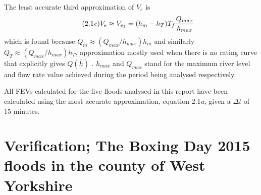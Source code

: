 \documentclass[11pt,a4paper]{article}
\begin{document}
The least accurate third approximation of $V_e$ is
\begin{equation}\tag{2.1\textit{e}}
V_e\approx V_{e_3}=(h_m-h_T)T_f\frac{Q_{max}}{h_{max}}
\end{equation}
which is found because $Q_m\approx (Q_{max}/h_{max})h_m$ and similarly $Q_T\approx (Q_{max}/h_{max})h_T$, approximation mostly used when there is no rating curve that explicitly gives $Q(\overline{h})$ \cite{Calder-Don}. $h_{max}$ and $Q_{max}$ stand for the maximum river level and flow rate value achieved during the period being analysed respectively. 

All FEVs calculated for the five floods analysed in this report have been calculated using the most accurate approximation, equation 2.1\textit{a}, given a $\Delta t$ of 15 minutes.

\section{Verification; The Boxing Day 2015 floods in the county of West Yorkshire}
\end{document}
